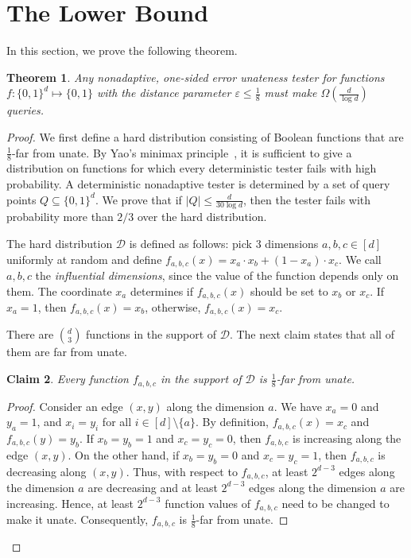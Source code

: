 \documentclass[11pt]{article}
\newtheorem{theorem}{Theorem}[section]
\newtheorem{claim}[theorem]{Claim}
\newcommand{\eps}{\varepsilon}
\newcommand{\cD}{\mathcal{D}}
\begin{document}
\section{The Lower Bound}
In this section, we prove the following theorem.
\begin{theorem}\label{thm:main-lb}
Any nonadaptive, one-sided error unateness tester for functions $f:\{0,1\}^d \mapsto \{0,1\}$ with the distance parameter $\eps \leq \frac{1}{8}$ must make $\Omega(\frac{d}{\log d})$ queries.
\end{theorem}
\begin{proof}
We first define a hard distribution consisting of Boolean functions that are $\frac{1}{8}$-far from unate.
By Yao's minimax principle~\cite{Yao77}, it is sufficient to give a distribution on functions for which every deterministic tester fails with high probability.
A deterministic nonadaptive tester is determined by a set of query points $Q \subseteq \{0,1\}^d$.
We prove that if $|Q| \leq \frac{d}{30 \log d}$, then the tester fails with probability more than $2/3$ over the
hard distribution. 

The hard distribution $\cD$ is defined as follows: pick $3$ dimensions $a,b,c \in [d]$ uniformly at random and define $f_{a,b,c}(x) = x_a \cdot x_b + (1-x_a) \cdot x_c$. We call $a,b,c$ the {\em influential dimensions}, since the value of the function depends only on them. The coordinate $x_a$ determines if $f_{a,b,c}(x)$ should be set to $x_b$ or $x_c$. If $x_a = 1$, then $f_{a,b,c}(x) = x_b$, otherwise, $f_{a,b,c}(x) = x_c$.

There are $d \choose 3$ functions in the support of $\cD$.
The next claim states that all of them are far from unate.
\begin{claim}
Every function $f_{a,b,c}$ in the support of $\cD$ is $\frac{1}{8}$-far from unate.
\end{claim}
\begin{proof}
Consider an edge $(x,y)$ along the dimension $a$. We have $x_a = 0$ and $y_a = 1$, and $x_i = y_i$ for all $i \in [d] \setminus \{a\}$. 
By definition, $f_{a,b,c}(x) = x_c$ and $f_{a,b,c}(y) = y_b$.
If $x_b = y_b = 1$ and $x_c = y_c = 0$, then $f_{a,b,c}$ is increasing along the edge $(x,y)$. 
On the other hand, if $x_b = y_b = 0$ and $x_c = y_c = 1$, then $f_{a,b,c}$ is decreasing along $(x,y)$. Thus, with respect to $f_{a,b,c}$, at least $2^{d-3}$ edges along the dimension $a$ are decreasing and at least $2^{d-3}$ edges along the dimension $a$ are increasing. 
Hence, at least $2^{d-3}$ function values of $f_{a,b,c}$ need to be changed to make it unate. 
Consequently, $f_{a,b,c}$ is $\frac{1}{8}$-far from unate.
\end{proof}


\end{proof}
\end{document}
